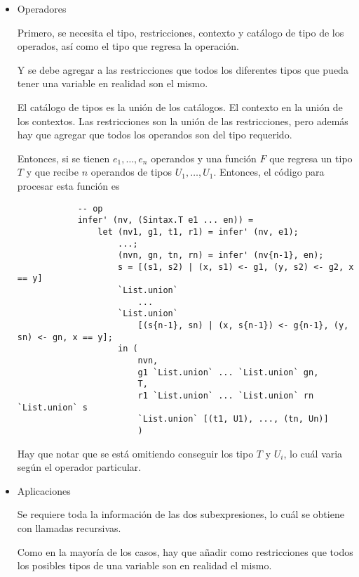 \documentclass{article}
\begin{document}
\begin{itemize}
        \item Operadores

        Primero, se necesita el tipo, restricciones, contexto y catálogo de tipo
        de los operados, así como el tipo que regresa la operación.

        Y se debe agregar a las restricciones que todos los diferentes tipos que 
        pueda tener una variable en realidad son el mismo.

        El catálogo de tipos es la unión de los catálogos. El contexto en la
        unión de los contextos. Las restricciones son la unión de las
        restricciones, pero además hay que agregar que todos los operandos son
        del tipo requerido.

        Entonces, si se tienen $e_1, \dots, e_n$ operandos y una función $F$ que
        regresa un tipo $T$ y que recibe $n$ operandos de tipos 
        $U_1, \dots, U_1$. Entonces, el código para procesar esta función es 

        \begin{verbatim}
            -- op
            infer' (nv, (Sintax.T e1 ... en)) = 
                let (nv1, g1, t1, r1) = infer' (nv, e1);
                    ...;
                    (nvn, gn, tn, rn) = infer' (nv{n-1}, en);
                    s = [(s1, s2) | (x, s1) <- g1, (y, s2) <- g2, x == y]
                    `List.union`
                        ...
                    `List.union`
                        [(s{n-1}, sn) | (x, s{n-1}) <- g{n-1}, (y, sn) <- gn, x == y];
                    in (
                        nvn, 
                        g1 `List.union` ... `List.union` gn, 
                        T, 
                        r1 `List.union` ... `List.union` rn `List.union` s 
                        `List.union` [(t1, U1), ..., (tn, Un)]
                        )
        \end{verbatim}

        Hay que notar que se está omitiendo conseguir los tipo $T$ y $U_i$, lo
        cuál varia según el operador particular. 

        \item Aplicaciones

        Se requiere toda la información de las dos subexpresiones, lo cuál se
        obtiene con llamadas recursivas.

        Como en la mayoría de los casos, hay que añadir como restricciones que
        todos los posibles tipos de una variable son en realidad el mismo.


\end{itemize}
\end{document}
